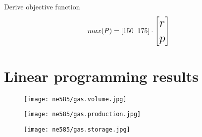 \documentclass[aspectratio=1610,pdftex,dvipsnames,compress,xcolor={dvipsnames}]{beamer}
\begin{document}
\begin{frame}{Derive objective function}
    \begin{equation}
        \LARGE
        max(P) = [150 \; \; 175]
            \cdot 
        \begin{bmatrix} r \\ p \end{bmatrix}
    \end{equation}
\end{frame}


\section{Linear programming results}


\addtocounter{framenumber}{-1} 
\begin{frame}{}
    \begin{figure}
        \centering
        \texttt{[image: ne585/gas.volume.jpg]}
    \end{figure}
\end{frame}


\begin{frame}{}
    \begin{figure}
        \centering
        \texttt{[image: ne585/gas.production.jpg]}
    \end{figure}
\end{frame}


\begin{frame}{}
    \begin{figure}
        \centering
        \texttt{[image: ne585/gas.storage.jpg]}
    \end{figure}
\end{frame}
\end{document}

